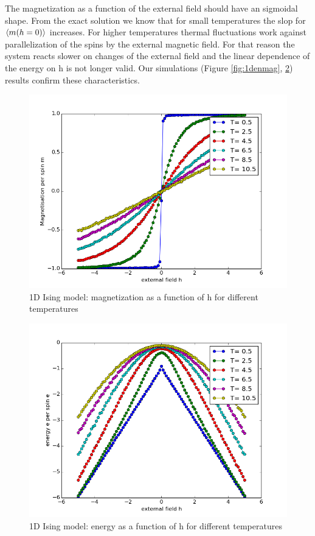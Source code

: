 \documentclass[12pt,a4paper,titlepage]{article}
\begin{document}
The magnetization as a function of the external field should have an sigmoidal shape. From the exact solution we know that for small temperatures the slop for $\braket{m(h=0)}$ increases. For higher temperatures thermal fluctuations work against parallelization of the spins by the external magnetic field. For that reason the system reacts slower on changes of the external field and the linear dependence of the energy on h is not longer valid. Our simulations (Figure \ref{fig:1denmag}, \ref{fig:1denmult}) results confirm these characteristics.



\begin{figure}
\centering
\includegraphics[width=12cm]{Plots/differnt_t_and_h_s_DOTS}
\caption{1D Ising model: magnetization as a function of h for different temperatures}
\label{fig:1dmagmult}
\end{figure}

\begin{figure}
\centering
\includegraphics[width=12cm]{Plots/differnt_t_and_h_s_ENERGY}
\caption{1D Ising model: energy as a function of h for different temperatures}
\label{fig:1denmult}
\end{figure}
\end{document}
